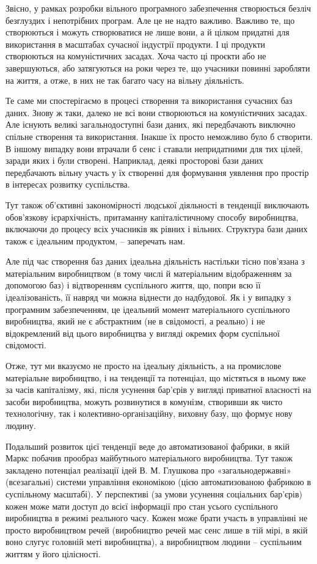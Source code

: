 \documentclass[12pt,a4paper,openany]{book}
\begin{document}
Звісно, у рамках розробки вільного програмного забезпечення створюється безліч безглуздих і непотрібних програм. Але це не надто важливо. Важливо те, що створюються і можуть створюватися не лише вони, а й цілком придатні для використання в масштабах сучасної індустрії продукти. І ці продукти створюються на комуністичних засадах. Хоча часто ці проєкти або не завершуються, або затягуються на роки через те, що учасники повинні заробляти на життя, а отже, в них не так багато часу на вільну діяльність.

Те саме ми спостерігаємо в процесі створення та використання сучасних баз даних. Знову ж таки, далеко не всі вони створюються на комуністичних засадах. Але існують великі загальнодоступні бази даних, які передбачають виключно спільне створення та використання. Інакше їх просто неможливо було б створити. В іншому випадку вони втрачали б сенс і ставали непридатними для тих цілей, заради яких і були створені. Наприклад, деякі просторові бази даних передбачають вільну участь у їх створенні для формування уявлення про простір в інтересах розвитку суспільства.

Тут також об’єктивні закономірності людської діяльності в тенденції виключають обов’язкову ієрархічність, притаманну капіталістичному способу виробництва, включаючи до процесу всіх учасників як рівних і вільних. Структура бази даних також є ідеальним продуктом, – заперечать нам.

Але під час створення баз даних ідеальна діяльність настільки тісно пов’язана з матеріальним виробництвом (в тому числі й матеріальним відображенням за допомогою баз) і відтворенням суспільного життя, що, попри всю її ідеалізованість, її навряд чи можна віднести до надбудової. Як і у випадку з програмним забезпеченням, це ідеальний момент матеріального суспільного виробництва, який не є абстрактним (не в свідомості, а реально) і не відокремлений від цього виробництва у вигляді окремих форм суспільної свідомості.

Отже, тут ми вказуємо не просто на ідеальну діяльність, а на промислове матеріальне виробництво, і на тенденції та потенціал, що містяться в ньому вже за часів капіталізму, які, після усунення бар’єрів у вигляді приватної власності на засоби виробництва, можуть розвинутися в комунізм, створивши як чисто технологічну, так і колективно-організаційну, виховну базу, що формує нову людину.

Подальший розвиток цієї тенденції веде до автоматизованої фабрики, в якій Маркс побачив прообраз майбутнього матеріального виробництва. Тут також закладено потенціал реалізації ідей В. М. Глушкова про «загальнодержавні» (всезагальні) системи управління економікою (цією автоматизованою фабрикою в суспільному масштабі). У перспективі (за умови усунення соціальних бар’єрів) кожен може мати доступ до всієї інформації про стан усього суспільного виробництва в режимі реального часу. Кожен може брати участь в управлінні не просто виробництвом речей (виробництво речей має сенс лише в тій мірі, в якій воно слугує головній меті виробництва), а виробництвом людини – суспільним життям у його цілісності.
\end{document}

